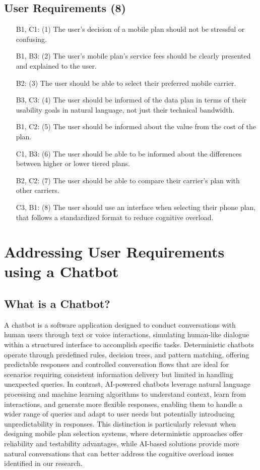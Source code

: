 \documentclass[conference]{IEEEtran}
\begin{document}
\subsection{User Requirements (8)}
\begin{enumerate}
\item [{B1, C1}: (1)] The user's decision of a mobile plan should not be stressful or confusing.
\item [{B1, B3}: (2)] The user's mobile plan's service fees should be clearly presented and explained to the user.
\item [{B2}: (3)] The user should be able to select their preferred mobile carrier.
\item [{B3, C3}: (4)] The user should be informed of the data plan in terms of their usability goals in natural language, not just their technical bandwidth.
\item [{B1, C2}: (5)] The user should be informed about the value from the cost of the plan.
\item [{C1, B3}: (6)] The user should be able to be informed about the differences between higher or lower tiered plans.
\item [{B2, C2}: (7)] The user should be able to compare their carrier's plan with other carriers.
\item [{C3, B1}: (8)] The user should use an interface when selecting their phone plan, that follows a standardized format to reduce cognitive overload.
\end{enumerate}

\section{Addressing User Requirements using a Chatbot}
\subsection{What is a Chatbot?}
A chatbot is a software application designed to conduct conversations with human users through text or voice interactions, simulating human-like dialogue within a structured interface to accomplish specific tasks. Deterministic chatbots operate through predefined rules, decision trees, and pattern matching, offering predictable responses and controlled conversation flows that are ideal for scenarios requiring consistent information delivery but limited in handling unexpected queries. In contrast, AI-powered chatbots leverage natural language processing and machine learning algorithms to understand context, learn from interactions, and generate more flexible responses, enabling them to handle a wider range of queries and adapt to user needs but potentially introducing unpredictability in responses. This distinction is particularly relevant when designing mobile plan selection systems, where deterministic approaches offer reliability and testability advantages, while AI-based solutions provide more natural conversations that can better address the cognitive overload issues identified in our research.
\end{document}
